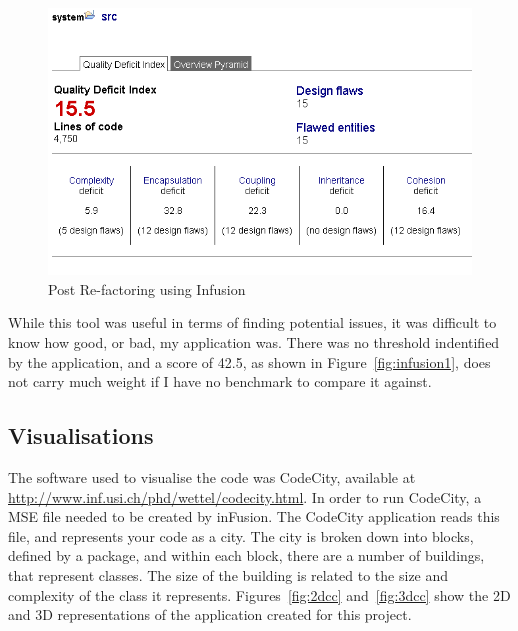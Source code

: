 \begin{figure}[H]
\begin{center}
\includegraphics[scale=0.7]{infusion2.PNG}
\caption{Post Re-factoring using Infusion}
\end{center}
\end{figure}

While this tool was useful in terms of finding potential issues, it was difficult to know how good, or bad, my application was. There was no threshold indentified by the application, and a score of 42.5, as shown in Figure~\ref{fig:infusion1}, does not carry much weight if I have no benchmark to compare it against. 

\subsection{Visualisations}

The software used to visualise the code was CodeCity, available at \hyperref[Code City]{http://www.inf.usi.ch/phd/wettel/codecity.html}. In order to run CodeCity, a MSE file needed to be created by inFusion. The CodeCity application reads this file, and represents your code as a city. The city is broken down into blocks, defined by a package, and within each block, there are a number of buildings, that represent classes. The size of the building is related to the size and complexity of the class it represents. Figures~\ref{fig:2dcc} and~\ref{fig:3dcc} show the 2D and 3D representations of the application created for this project. 
 
